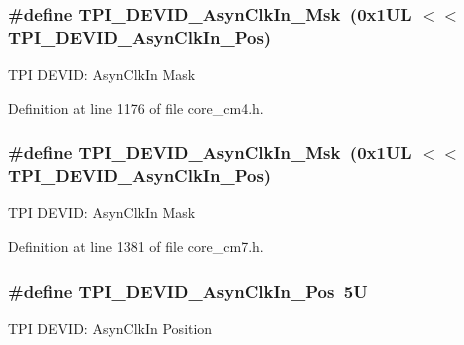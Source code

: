 \subsubsection[{\texorpdfstring{T\+P\+I\+\_\+\+D\+E\+V\+I\+D\+\_\+\+Asyn\+Clk\+In\+\_\+\+Msk}{TPI_DEVID_AsynClkIn_Msk}}]{\setlength{\rightskip}{0pt plus 5cm}\#define T\+P\+I\+\_\+\+D\+E\+V\+I\+D\+\_\+\+Asyn\+Clk\+In\+\_\+\+Msk~(0x1\+U\+L $<$$<$ T\+P\+I\+\_\+\+D\+E\+V\+I\+D\+\_\+\+Asyn\+Clk\+In\+\_\+\+Pos)}\hypertarget{group___c_m_s_i_s___t_p_i_gab67830557d2d10be882284275025a2d3}{}\label{group___c_m_s_i_s___t_p_i_gab67830557d2d10be882284275025a2d3}
T\+PI D\+E\+V\+ID\+: Asyn\+Clk\+In Mask 

Definition at line 1176 of file core\+\_\+cm4.\+h.

\subsubsection[{\texorpdfstring{T\+P\+I\+\_\+\+D\+E\+V\+I\+D\+\_\+\+Asyn\+Clk\+In\+\_\+\+Msk}{TPI_DEVID_AsynClkIn_Msk}}]{\setlength{\rightskip}{0pt plus 5cm}\#define T\+P\+I\+\_\+\+D\+E\+V\+I\+D\+\_\+\+Asyn\+Clk\+In\+\_\+\+Msk~(0x1\+U\+L $<$$<$ T\+P\+I\+\_\+\+D\+E\+V\+I\+D\+\_\+\+Asyn\+Clk\+In\+\_\+\+Pos)}\hypertarget{group___c_m_s_i_s___t_p_i_gab67830557d2d10be882284275025a2d3}{}\label{group___c_m_s_i_s___t_p_i_gab67830557d2d10be882284275025a2d3}
T\+PI D\+E\+V\+ID\+: Asyn\+Clk\+In Mask 

Definition at line 1381 of file core\+\_\+cm7.\+h.

\subsubsection[{\texorpdfstring{T\+P\+I\+\_\+\+D\+E\+V\+I\+D\+\_\+\+Asyn\+Clk\+In\+\_\+\+Pos}{TPI_DEVID_AsynClkIn_Pos}}]{\setlength{\rightskip}{0pt plus 5cm}\#define T\+P\+I\+\_\+\+D\+E\+V\+I\+D\+\_\+\+Asyn\+Clk\+In\+\_\+\+Pos~5U}\hypertarget{group___c_m_s_i_s___t_p_i_gab382b1296b5efd057be606eb8f768df8}{}\label{group___c_m_s_i_s___t_p_i_gab382b1296b5efd057be606eb8f768df8}
T\+PI D\+E\+V\+ID\+: Asyn\+Clk\+In Position 

